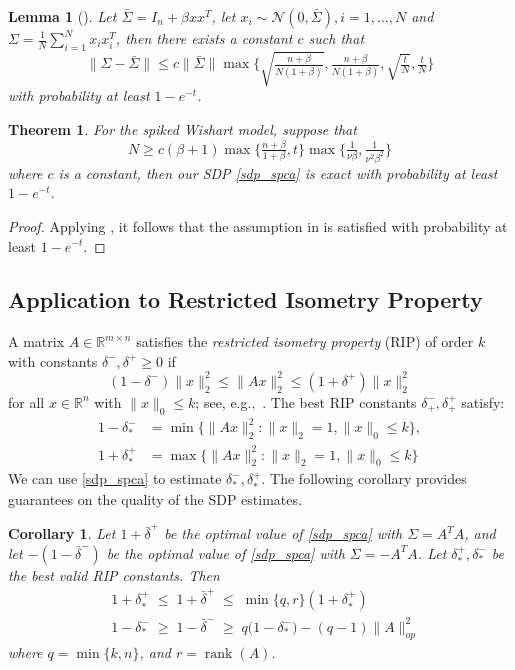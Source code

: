 \documentclass[11pt]{amsart}
\theoremstyle{plain}
\newtheorem{thm}{Theorem}[section]
\newtheorem{lem}{Lemma}[section]
\newtheorem{cor}{Corollary}[section]
\theoremstyle{definition}
\theoremstyle{remark}
\newcommand{\RR}{\mathbb{R}}
\DeclareMathOperator{\rank}{rank}
\begin{document}
	\begin{lem}[\cite{koltchinskii2017normal}]\label{lem:wishart}
		Let \(\bar \Sigma = I_n + \beta xx^T\), let $x_i\sim \mathcal{N}(0,\bar \Sigma), i=1,\dots,N$ and $\Sigma = \frac{1}{N}\sum_{i=1}^Nx_ix_i^T$, then there exists a constant \(c\) such that 
		\begin{equation}
			\|\Sigma - \bar\Sigma\| \leq c\|\bar\Sigma\| \max\Big\{\sqrt{\tfrac{n+\beta}{N(1+\beta)}},\tfrac{n+\beta}{N(1+\beta)},\sqrt{\tfrac{t}{N}},\tfrac{t}{N}\Big\}
		\end{equation}
		with probability at least \(1 - e^{-t}\).
	\end{lem}
	\begin{thm}\label{cor:wishart}
		For the spiked Wishart model, suppose that
		\[
		N \geq c(\beta+1)\max\{\tfrac{n+\beta}{1+\beta},t\} \max\{\tfrac{1}{\nu\beta},\tfrac{1}{\nu^2\beta^2}\}
		\]
		where \(c\) is a constant, then our SDP \eqref{sdp_spca} is exact with probability at least \(1 - e^{-t}\).
	\end{thm}
	\begin{proof}
		Applying , it follows that the assumption in  is satisfied with probability at least  \(1 - e^{-t}\).
	\end{proof}
	
	\subsection{Application to Restricted Isometry Property}\label{subsection:spca_ric}
	A matrix $A\in\RR^{m\times n}$ satisfies the \emph{restricted isometry property} (RIP) of order $k$ with constants $\delta^-,\delta^+\geq0$ if 
	\begin{equation}\label{eq:rip}
		(1-\delta^-)\|x\|_2^2 \leq \|Ax\|^2_2 \leq (1+\delta^+)\|x\|_2^2
	\end{equation}
	for all $x\in\RR^n$ with $\|x\|_0\leq k$;
	see, e.g.,~\cite{candes2008restricted}.
	The best RIP constants $\delta^-_+,\delta^+_+$ satisfy:
	\begin{align*}
		1 - \delta^-_* &=
		\min\{ \|Ax\|^2_2 : \|x\|_2 = 1, \|x\|_0 \leq k \},
		\\
		1 + \delta^+_* &=
		\max\{ \|Ax\|^2_2 : \|x\|_2 = 1, \|x\|_0 \leq k \}
	\end{align*}
	We can use \eqref{sdp_spca} to estimate $\delta^-_*,\delta^+_*$.
	The following corollary provides guarantees on the quality of the SDP estimates.
	
	\begin{cor}
		Let \(1+\bar \delta^+\) be the optimal value of  \eqref{sdp_spca} with  \(\Sigma = A^TA\),
		and let \( - (1 - \bar \delta^-)\) be the optimal value of  \eqref{sdp_spca} with  \(\Sigma = -A^TA\).
		Let \(\delta^+_*, \delta^-_*\) be the best valid RIP constants.
		Then
		\begin{align*}
			&1+\delta^+_*
			\;\leq\;
			{1+\bar\delta^+}
			\;\leq\;
			\min\{q,r\} (1+\delta^+_*)
			\\
			&1-\delta^-_*
			\;\geq\;
			{1-\bar \delta^-}
			\;\geq\;
			q \big(1-\delta^-_* \big) - (q-1) \|A\|_{op}^2
		\end{align*}
		where \(q = \min\{k,n\}\), and \(r = \rank(A)\).
	\end{cor}
	
\end{document}
